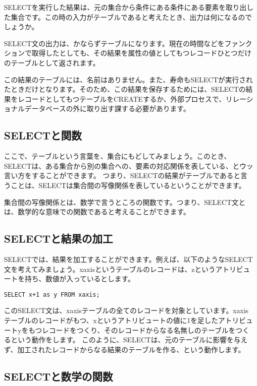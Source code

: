 SELECTを実行した結果は、元の集合から条件にある条件にある要素を取り出した集合です。この時の入力がテーブルであると考えたとき、出力は何になるのでしょうか。

SELECT文の出力は、かならずテーブルになります。現在の時間などをファンクションで取得したとしても、その結果を属性の値としてもつレコードひとつだけのテーブルとして返されます。

この結果のテーブルには、名前はありません。また、寿命もSELECTが実行されたときだけとなります。そのため、この結果を保存するためには、SELECTの結果をレコードとしてもつテーブルをCREATEするか、外部プロセスで、リレーショナルデータベースの外に取り出す課する必要があります。

\subsection{SELECTと関数}

ここで、テーブルという言葉を、集合にもどしてみましょう。このとき、SELECTは、ある集合から別の集合への、要素の対応関係を表している、とウッ言い方をすることができます。
つまり、SELECTの結果がテーブルであると言うことは、SELECTは集合間の写像関係を表しているということができます。

集合間の写像関係とは、数学で言うところの関数です。つまり、SELECT文とは、数学的な意味での関数であると考えることができます。

\subsection{SELECTと結果の加工}

SELECTでは、結果を加工することができます。例えば、以下のようなSELECT文を考えてみましょう。xaxisというテーブルのレコードは、zというアトリビュートを持ち、数値が入っているとします。

\begin{verbatim}
SELECT x+1 as y FROM xaxis;
\end{verbatim}

このSELECT文は、xaxisテーブルの全てのレコードを対象としています。xaxisテーブルのレコードがもつ、xというアトリビュートの値に1を足したアトリビュートyをもつレコードをつくり、そのレコードからなる名無しのテーブルをつくるという動作をします。
このように、SELECTは、元のテーブルに影響を与えず、加工されたレコードからなる結果のテーブルを作る、という動作します。


\subsection{SELECTと数学の関数}

